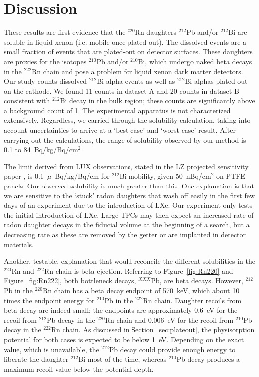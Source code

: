 \section{Discussion}
These results are first evidence that the $^{220}$Rn daughters $^{212}$Pb and/or $^{212}$Bi are soluble in liquid xenon (i.e. mobile once plated-out). The dissolved events are a small fraction of events that are plated-out on detector surfaces. These daughters are proxies for the isotopes $^{210}$Pb and/or $^{210}$Bi, which undergo naked beta decays in the $^{222}$Rn chain and pose a problem for liquid xenon dark matter detectors. Our study counts dissolved $^{212}$Bi alpha events as well as $^{212}$Bi alphas plated out on the cathode. We found 11 counts in dataset A and 20 counts in dataset B consistent with $^{212}$Bi decay in the bulk region; these counts are significantly above a background count of 1. The experimental apparatus is not characterized extensively. Regardless, we carried through the solubility calculation, taking into account uncertainties to arrive at a `best case' and `worst case' result. After carrying out the calculations, the range of solubility observed by our method is 0.1 to 84~Bq/kg/Bq/cm$^{2}$

The limit derived from \ac{LUX} observations, stated in the \ac{LZ} projected sensitivity paper \cite{LZ:Sensitivity}, is 0.1~$\mu$~Bq/kg/Bq/cm for $^{212}$Bi mobility, given 50~nBq/cm$^{2}$ on \ac{PTFE} panels. Our observed solubility is much greater than this. One explanation is that we are sensitive to the `stuck' radon daughters that wash off easily in the first few days of an experiment due to the introduction of \ac{LXe}. Our experiment only tests the initial introduction of \ac{LXe}. Large \ac{TPC}s may then expect an increased rate of radon daughter decays in the fiducial volume at the beginning of a search, but a decreasing rate as these are removed by the getter or are implanted in detector materials. 

Another, testable, explanation that would reconcile the different solubilities in the $^{220}$Rn and $^{222}$Rn chain is beta ejection. Referring to Figure~\ref{fig:Rn220} and Figure~\ref{fig:Rn222}, both bottleneck decays, $^{XXX}$Pb, are beta decays. However, $^{212}$Pb in the $^{220}$Rn chain has a beta decay endpoint of 570~keV, which about 10 times the endpoint energy for $^{210}$Pb in the $^{222}$Rn chain. Daughter recoils from beta decay are indeed small; the endpoints are approximately 0.6~eV for the recoil from $^{212}$Pb decay in the $^{220}$Rn chain and  0.006~eV for the recoil from $^{210}$Pb decay in the $^{222}$Rn chain. As discussed in Section~\ref{sec:plateout}, the physisorption potential for both cases is expected to be below 1~eV. Depending on the exact value, which is unavailable, the $^{212}$Pb decay could provide enough energy to liberate the daughter $^{212}$Bi most of the time, whereas $^{210}$Pb decay produces a maximum recoil value below the potential depth. 


